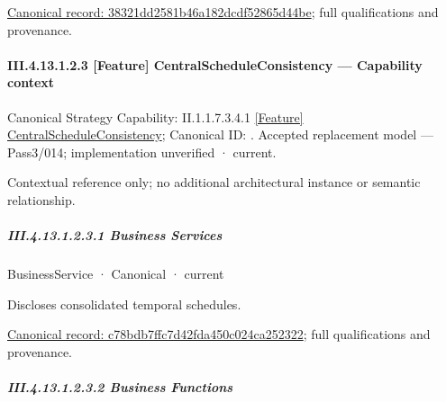 {\footnotesize \href{../../../../continuum/business/business-function/38321dd2581b46a182dcdf52865d44be.md}{Canonical record: 38321dd2581b46a182dcdf52865d44be}; full qualifications and provenance.}\par
\paragraph*{III.4.13.1.2.3 [Feature] CentralScheduleConsistency — Capability context}
\label{navigation:III.4.13.1.2.3}

{\small Canonical Strategy Capability: II.1.1.7.3.4.1 \hyperref[element:5a39c3923f0e4e079acf913126754075]{[Feature] CentralScheduleConsistency}; Canonical ID: \texttt{}. Accepted replacement model — Pass3/014; implementation unverified · current.}\par
Contextual reference only; no additional architectural instance or semantic relationship.\par
\subparagraph*{III.4.13.1.2.3.1 Business Services}
\label{navigation:III.4.13.1.2.3.1}

\label{navigation:III.4.13.1.2.3.1.1}

\label{element:c78bdb7ffc7d42fda450c024ca252322}
{\small BusinessService · Canonical · current}\par

Discloses consolidated temporal schedules.


{\footnotesize \href{../../../../continuum/business/business-service/c78bdb7ffc7d42fda450c024ca252322.md}{Canonical record: c78bdb7ffc7d42fda450c024ca252322}; full qualifications and provenance.}\par
\subparagraph*{III.4.13.1.2.3.2 Business Functions}
\label{navigation:III.4.13.1.2.3.2}

\label{navigation:III.4.13.1.2.3.2.1}


